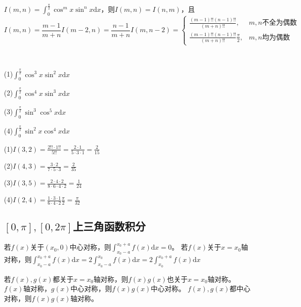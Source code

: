 ~

\begin{theorem}[Wallis推广]
  $I(m,n) = \int_0^{\frac{\pi}{2}} \cos ^m x \sin ^n x \mathrm{d}x$，则$I(m,n) = I(n,m)$，且
  \begin{equation*}
    I(m,n) = \frac{m-1}{m+n} I(m-2,n) = \frac{n-1}{m+n} I(m,n-2) =
    \begin{cases}
      \frac{(m-1)!!(n-1)!!}{(m+n)!!}, &m,n\text{不全为偶数}\\
      \frac{(m-1)!!(n-1)!!}{(m+n)!!}\frac{\pi}{2},& m,n\text{均为偶数}
    \end{cases}
  \end{equation*}
\end{theorem}

~

\begin{exercise}[基础练习]
  (1)$\int_0^{\frac{\pi}{2}} \cos ^3 x \sin^2 x\mathrm{d}x$

  (2)$\int_0^{\frac{\pi}{2}} \cos ^4 x \sin^3 x \mathrm{d}x$

  (3)$\int_0^{\frac{\pi}{2}} \sin^3 \cos^5 x\mathrm{d}x$

  (4)$\int_0^{\frac{\pi}{2}}\sin^2 x \cos^4 x\mathrm{d}x$
\end{exercise}

\begin{solution}
  (1)$I(3,2) = \frac{2!!\cdot 1!!}{5!!} = \frac{2 \cdot 1}{5\cdot 3 \cdot 1} = \frac{2}{15}$

  (2)$I(4,3) = \frac{3 \cdot 2}{7\cdot 5 \cdot 3} = \frac{2}{35}$

  (3)$I(3,5) = \frac{2 \cdot 4 \cdot 2}{8\cdot 6\cdot 4\cdot 2} = \frac{1}{24}$

  (4)$I(2,4) = \frac{1 \cdot 3 \cdot 1}{6 \cdot 4 \cdot 2}\frac{\pi}{2} = \frac{\pi}{32}$
\end{solution}

\subsection{$[0,\pi],[0,2\pi]$上三角函数积分}

\begin{theorem}[对称性的积分]
  若$f(x)$关于$(x_0,0)$中心对称，则$\int_{x_0 - a}^{x_0 + a} f(x)\mathrm{d}x = 0$。
  若$f(x)$关于$x  = x_0$轴对称，则$\int_{x_0 - a}^{x_0 + a}f(x)\mathrm{d}x = 2 \int_{x_0 - a}^{x_0} f(x)\mathrm{d}x = 2 \int_{x_0}^{x_0 + a} f(x)\mathrm{d}x$
\end{theorem}

\begin{note}
  若$f(x),g(x)$都关于$x = x_0$轴对称，则$f(x)g(x)$也关于$x = x_0$轴对称。
  $f(x)$轴对称，$g(x)$中心对称，则$f(x)g(x)$中心对称。
  $f(x),g(x)$都中心对称，则$f(x)g(x)$轴对称。
\end{note}


